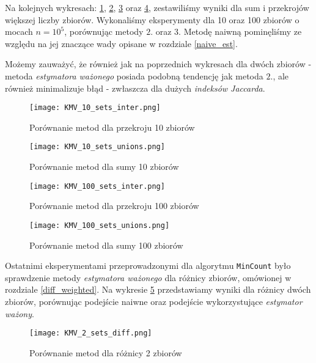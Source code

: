 Na kolejnych wykresach: \ref{fig:KMV_10sets_inter}, \ref{fig:KMV_10sets_unions}, \ref{fig:KMV_100sets_inter} oraz \ref{fig:KMV_100sets_unions}, zestawiliśmy wyniki dla sum i przekrojów większej liczby zbiorów. Wykonaliśmy eksperymenty dla 10 oraz 100 zbiorów o mocach $n = 10^5$, porównując metody $2.$ oraz $3.$ Metodę naiwną pominęliśmy ze względu na jej znaczące wady opisane w rozdziale \ref{naive_est}. 

Możemy zauważyć, że również jak na poprzednich wykresach dla dwóch zbiorów - metoda \textit{estymatora ważonego} posiada podobną tendencję jak metoda $2.$, ale również minimalizuje błąd - zwłaszcza dla dużych \textit{indeksów Jaccarda}.

\begin{figure}[h!]
    \texttt{[image: KMV\_10\_sets\_inter.png]}
    \centering
    \caption{Porównanie metod dla przekroju 10 zbiorów}
    \label{fig:KMV_10sets_inter}
\end{figure}

\begin{figure}[h!]
    \texttt{[image: KMV\_10\_sets\_unions.png]}
    \centering
    \caption{Porównanie metod dla sumy 10 zbiorów}
    \label{fig:KMV_10sets_unions}
\end{figure}

\begin{figure}[h!]
    \texttt{[image: KMV\_100\_sets\_inter.png]}
    \centering
    \caption{Porównanie metod dla przekroju 100 zbiorów}
    \label{fig:KMV_100sets_inter}
\end{figure}

\begin{figure}[h!]
    \texttt{[image: KMV\_100\_sets\_unions.png]}
    \centering
    \caption{Porównanie metod dla sumy 100 zbiorów}
    \label{fig:KMV_100sets_unions}
\end{figure}

Ostatnimi eksperymentami przeprowadzonymi dla algorytmu \texttt{MinCount} było sprawdzenie metody \textit{estymatora ważonego} dla różnicy zbiorów, omówionej w rozdziale \ref{diff_weighted}. Na wykresie \ref{fig:KMV_2_sets_diff} przedstawiamy wyniki dla różnicy dwóch zbiorów, porównując podejście naiwne oraz podejście wykorzystujące \textit{estymator ważony}.

\begin{figure}[h!]
    \texttt{[image: KMV\_2\_sets\_diff.png]}
    \centering
    \caption{Porównanie metod dla różnicy 2 zbiorów}
    \label{fig:KMV_2_sets_diff}
\end{figure}

